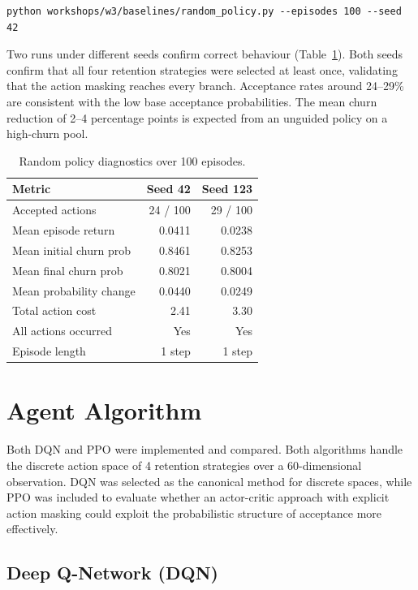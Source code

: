\documentclass{article}
\begin{document}
\begin{verbatim}
python workshops/w3/baselines/random_policy.py --episodes 100 --seed 42
\end{verbatim}

Two runs under different seeds confirm correct behaviour
(Table~\ref{tab:random_baseline}). Both seeds confirm that all four retention
strategies were selected at least once, validating that the action masking reaches
every branch. Acceptance rates around 24--29\% are consistent with the low base
acceptance probabilities. The mean churn reduction of 2--4 percentage points is
expected from an unguided policy on a high-churn pool.

\begin{table}[H]
\centering
\begin{tabular}{lrr}
\toprule
\textbf{Metric} & \textbf{Seed 42} & \textbf{Seed 123} \\
\midrule
Accepted actions         & 24 / 100 & 29 / 100 \\
Mean episode return      & 0.0411   & 0.0238   \\
Mean initial churn prob  & 0.8461   & 0.8253   \\
Mean final churn prob    & 0.8021   & 0.8004   \\
Mean probability change  & 0.0440   & 0.0249   \\
Total action cost        & 2.41     & 3.30     \\
All actions occurred     & Yes      & Yes      \\
Episode length           & 1 step   & 1 step   \\
\bottomrule
\end{tabular}
\caption{Random policy diagnostics over 100 episodes.}
\label{tab:random_baseline}
\end{table}

\section{Agent Algorithm}

Both DQN and PPO were implemented and compared. Both algorithms handle the discrete action space
of 4 retention strategies over a 60-dimensional observation. DQN was selected as the canonical
method for discrete spaces, while PPO was included to evaluate whether an actor-critic approach
with explicit action masking could exploit the probabilistic structure of acceptance more effectively.

\subsection{Deep Q-Network (DQN)}
\end{document}
